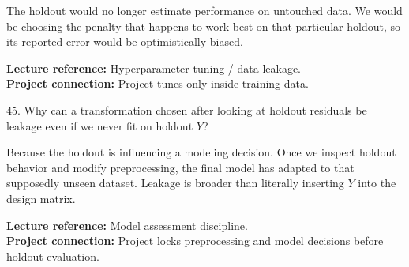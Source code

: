 \documentclass[10.5pt,a4paper]{article}
\newcommand{\chapref}[1]{\textbf{Lecture reference:} #1}
\newcommand{\projectref}[1]{\textbf{Project connection:} #1}
\begin{document}
\begin{answerbox}The holdout would no longer estimate performance on untouched data. We would be choosing the penalty that happens to work best on that particular holdout, so its reported error would be optimistically biased.\end{answerbox}
\begin{refbox}\chapref{Hyperparameter tuning / data leakage.}\\\projectref{Project tunes only inside training data.}\end{refbox}
\begin{qbox}{45. Why can a transformation chosen after looking at holdout residuals be leakage even if we never fit on holdout $Y$?}
\end{qbox}
\begin{answerbox}Because the holdout is influencing a modeling decision. Once we inspect holdout behavior and modify preprocessing, the final model has adapted to that supposedly unseen dataset. Leakage is broader than literally inserting \(Y\) into the design matrix.\end{answerbox}
\begin{refbox}\chapref{Model assessment discipline.}\\\projectref{Project locks preprocessing and model decisions before holdout evaluation.}\end{refbox}
\end{document}
